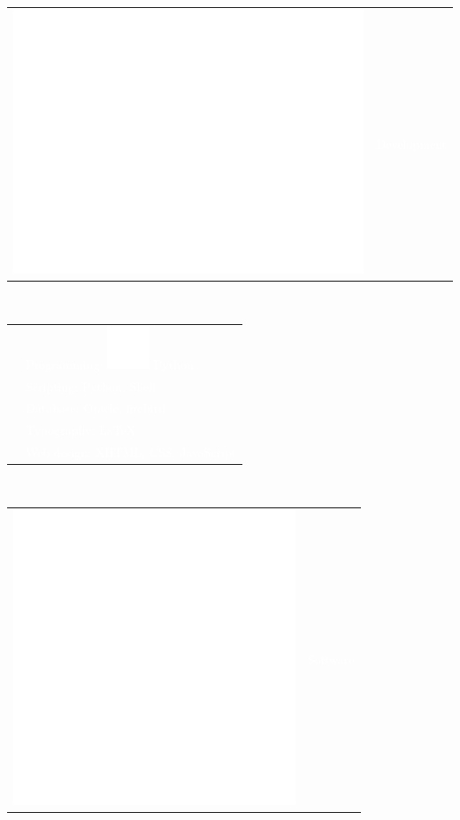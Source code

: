 \documentclass[letterpaper]{article}
\begin{document}
\begin{minipage}[t]{1.\linewidth}
\begin{minipage}{0.47\linewidth}
{\begin{minipage}{1\linewidth}
\begin{minipage}{1\linewidth}
\begin{minipage}[t]{0.47\linewidth}
\begin{minipage}{1\linewidth}
{				} 
			\end{minipage}	
		\end{minipage}
		\hfill
		\begin{minipage}[t]{0.47\linewidth}
			\begin{tabularx}{1\textwidth}{rX}
				\includegraphics[width=0.1\linewidth]{code.eps} & 
				\large\textmd{\textcolor{white}{Development}}\\
			\end{tabularx}\\
			\vspace{1ex}
			\textcolor{white}{\small
			\begin{tabularx}{1\textwidth}{rX}
				 & \textmd{Programming:} \includegraphics[trim=0.18cm 0.18cm 
				 0.18cm 
				 0.18cm, clip=true, width=0.08\linewidth]{python-48.png} 
				 {\scriptsize Python}\\
				& \textmd{Scripting:} {\scriptsize Python, Shell}\\
				& \textmd{Database:} {\scriptsize Oracle, firebird}\\
				& \textmd{Typography:} {\scriptsize \LaTeX}\\
				& \textmd{Web design:} {\scriptsize XHTML, CSS, JavaScript}\\
			\end{tabularx}
			}
		\end{minipage}				
	\end{minipage}\\
	\begin{minipage}{1\linewidth} %
		\vspace{2ex}
		\begin{minipage}[t]{0.47\linewidth}
			\begin{minipage}{1\linewidth}
				\begin{tabularx}{1\textwidth}{rX}
					\multirow{2}{*}{\includegraphics[width=0.18\linewidth]{arrows.eps}}
					& \large\textmd{\textcolor{white}{Software}}\\

\end{tabularx}
\end{minipage}
\end{minipage}
\end{minipage}
\end{minipage}}
\end{minipage}
\end{minipage}
\end{document}
